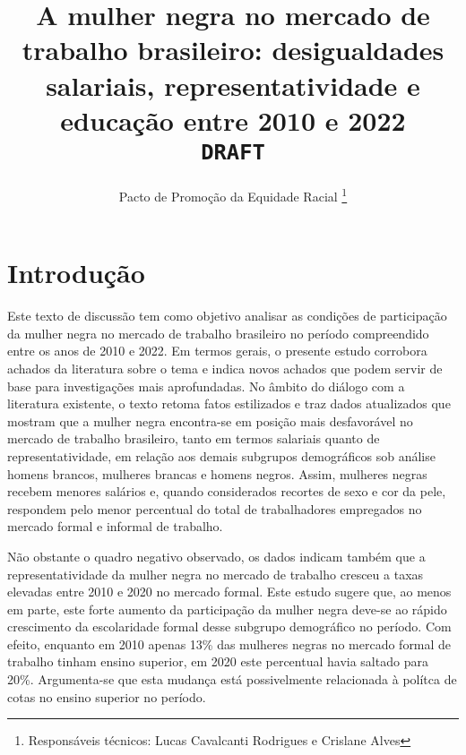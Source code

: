 \documentclass[12pt]{article}
\begin{document}
 

\linespread{1.1}

\title{%
  A mulher negra no mercado de trabalho brasileiro: desigualdades salariais, representatividade e educação entre 2010 e 2022\\
  \vspace{1cm}
  \Large \texttt{\MakeUppercase{DRAFT}}}

\author{Pacto de Promoção da Equidade Racial \thanks{Responsáveis técnicos: Lucas Cavalcanti Rodrigues e Crislane Alves}}


\maketitle

\clearpage

\thispagestyle{empty}

\thispagestyle{empty}

\section{Introdução}


\par Este texto de discussão tem como objetivo analisar as condições de participação da mulher negra no mercado de trabalho brasileiro no período compreendido entre os anos de 2010 e 2022. Em termos gerais, o presente estudo corrobora achados da literatura sobre o tema e indica novos achados que podem servir de base para investigações mais aprofundadas. No âmbito do diálogo com a literatura existente, o texto retoma fatos estilizados e traz dados atualizados que mostram que a mulher negra encontra-se em posição mais desfavorável no mercado de trabalho brasileiro, tanto em termos salariais quanto de representatividade, em relação aos demais subgrupos de\-mo\-grá\-fi\-cos sob análise \textemdash homens brancos, mulheres brancas e homens negros. Assim, mulheres negras recebem menores salários e, quando considerados recortes de sexo e cor da pele, respondem pelo menor percentual do total de trabalhadores empregados no mercado formal e informal de trabalho. 

\par Não obstante o quadro negativo observado, os dados indicam também que a representatividade da mulher negra no mercado de trabalho cresceu a taxas elevadas entre 2010 e 2020 no mercado formal. Este estudo sugere que, ao menos em parte, este forte aumento da participação da mulher negra deve-se ao rápido crescimento da escolaridade formal desse subgrupo demográfico no período. Com efeito, enquanto em 2010 apenas 13\% das mulheres negras no mercado formal de trabalho tinham ensino superior, em 2020 este percentual havia saltado para 20\%. Argumenta-se que esta mudança está possivelmente relacionada à polítca de cotas no ensino superior no período.
\end{document}
